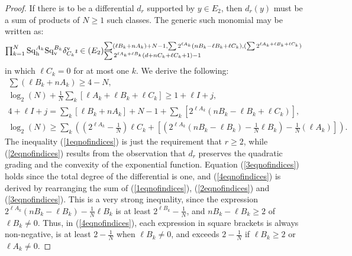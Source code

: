 \documentclass[11pt]{amsart}
\theoremstyle{plain}
\theoremstyle{definition}
\theoremstyle{plain}
\newcommand{\Sqh}{\mathrm{Sq}_\textup{h}}
\newcommand{\Sqv}{\mathrm{Sq}_\textup{v}}
\begin{document}
\begin{Calculations of HW0}
\begin{proof}
If there is to be a differential $d_r$ supported by $y\in E_2$, %
then $d_{r}(y) $ must be a sum of products of $N\geq1$ such classes. The generic such monomial may be written as:
\[\textstyle\prod_{k=1}^{N}\Sqh^{A_k}\Sqv^{B_k}\delta_{C_k}^\textup{v}\imath\in (E_2)^{\sum(\ell B_k+nA_k)+N-1,\sum2^{\ell A_k}(nB_k-\ell B_k+\ell C_k),(\sum2^{\ell A_k+\ell B_k+\ell C_k})}_{\sum2^{\ell A_k+\ell B_k}(d+nC_k+\ell C_k+1)-1}\]
in which $\ell C_k=0$ for at most one $k$. We derive the following:
\begin{gather}
\textstyle \sum(\ell B_k+nA_k)\geq4-N,\label{1eqnofindices}\\
\log_2(N)+\textstyle \frac{1}{N}\textstyle \sum_k \left[\ell A_k+\ell B_k+\ell C_k\right]\geq1+\ell I+j,\label{2eqnofindices}\\
4+\ell I+j=\textstyle\sum_{k}\left[\ell B_k+nA_{k}\right]+N-1+\textstyle\sum_{k}\left[2^{\ell A_k}(nB_k-\ell B_k+\ell C_k)\right]\label{3eqnofindices},\\
\log_2(N)\geq \textstyle\sum_{k}\left((2^{\ell A_k}-\frac{1}{N})\ell C_k+\left[\left(2^{\ell A_k}(nB_k-\ell B_k)-\frac{1}{N}\ell B_k\right)-\frac{1}{N}(\ell A_k)\right]\right).\label{4eqnofindices}
\end{gather}
The inequality (\ref{1eqnofindices}) is just the requirement that $r\geq2$, while (\ref{2eqnofindices}) results from the observation that $d_r$ preserves the quadratic grading and the convexity of the exponential function. Equation (\ref{3eqnofindices}) holds since the total degree of the differential is one, and (\ref{4eqnofindices}) is derived by rearranging the sum of (\ref{1eqnofindices}), (\ref{2eqnofindices}) and (\ref{3eqnofindices}).
This is a very strong inequality, since the expression $2^{\ell A_k}(nB_k-\ell B_k)-\frac{1}{N}\ell B_k$ is at least $2^{\ell B_k}-\frac{1}{N}$, and $nB_k-\ell B_k\geq2$ of $\ell B_k\neq0$. Thus, in  (\ref{4eqnofindices}), each expression in square brackets is always non-negative, is at least $2-\frac{1}{N}$ when $\ell B_k\neq0$, and exceeds $2-\frac{1}{N}$ if $\ell B_k\geq2$ or $\ell A_k\neq0$. 


\end{proof}
\end{Calculations of HW0}
\end{document}
